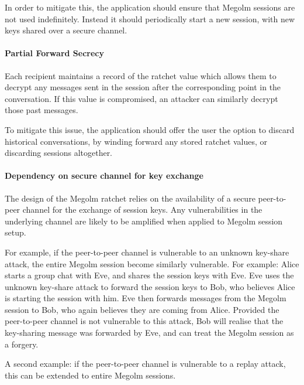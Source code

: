 In order to mitigate this, the application should ensure that Megolm sessions are not used indefinitely. Instead it should periodically start a new session, with new keys shared over a secure channel.

\paragraph{Partial Forward Secrecy}
Each recipient maintains a record of the ratchet value which allows them to decrypt any messages sent in the session after the corresponding point in the conversation. If this value is compromised, an attacker can similarly decrypt those past messages.

To mitigate this issue, the application should offer the user the option to discard historical conversations, by winding forward any stored ratchet values, or discarding sessions altogether.

\paragraph{Dependency on secure channel for key exchange}
The design of the Megolm ratchet relies on the availability of a secure peer-to-peer channel for the exchange of session keys. Any vulnerabilities in the underlying channel are likely to be amplified when applied to Megolm session setup.

For example, if the peer-to-peer channel is vulnerable to an unknown key-share attack, the entire Megolm session become similarly vulnerable. For example: Alice starts a group chat with Eve, and shares the session keys with Eve. Eve uses the unknown key-share attack to forward the session keys to Bob, who believes Alice is starting the session with him. Eve then forwards messages from the Megolm session to Bob, who again believes they are coming from Alice. Provided the peer-to-peer channel is not vulnerable to this attack, Bob will realise that the key-sharing message was forwarded by Eve, and can treat the Megolm session as a forgery.

A second example: if the peer-to-peer channel is vulnerable to a replay attack, this can be extended to entire Megolm sessions.






